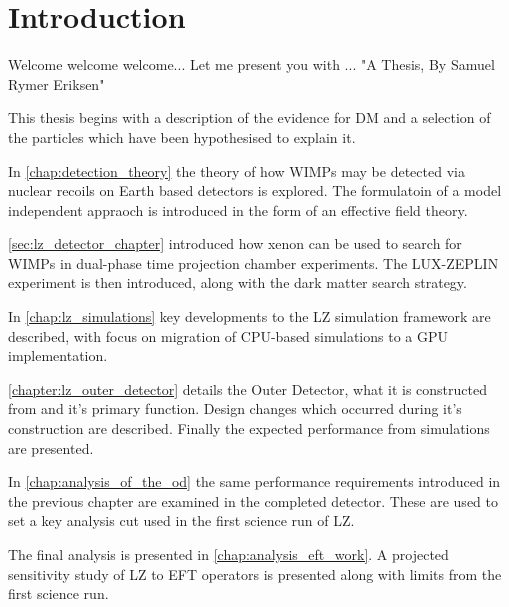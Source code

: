 \chapter{Introduction}
\par
Welcome welcome welcome...
Let me present you with ... "A Thesis, By Samuel Rymer Eriksen"

\par
This thesis begins with a description of the evidence for DM and a selection of the particles which have been hypothesised to explain it.
\par
In \autoref{chap:detection_theory} the theory of how WIMPs may be detected via nuclear recoils on Earth based detectors is explored. 
The formulatoin of a model independent appraoch is introduced in the form of an effective field theory.

\par
\autoref{sec:lz_detector_chapter} introduced how xenon can be used to search for WIMPs in dual-phase time projection chamber experiments.
The LUX-ZEPLIN experiment is then introduced, along with the dark matter search strategy.

\par
In \autoref{chap:lz_simulations} key developments to the LZ simulation framework are described, with focus on migration of CPU-based simulations to a GPU implementation.

\par
\autoref{chapter:lz_outer_detector} details the Outer Detector, what it is constructed from and it's primary function.
Design changes which occurred during it's construction are described.
Finally the expected performance from simulations are presented.

\par
In \autoref{chap:analysis_of_the_od} the same performance requirements introduced in the previous chapter are examined in the completed detector.
These are used to set a key analysis cut used in the first science run of LZ.

\par
The final analysis is presented in \autoref{chap:analysis_eft_work}.
A projected sensitivity study of LZ to EFT operators is presented along with limits from the first science run.